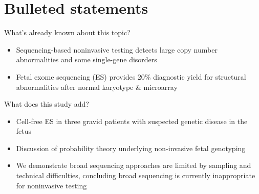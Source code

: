 \documentclass{article}\usepackage[]{graphicx}\usepackage[]{color}
\begin{document}
\title{}

\author[1,2,*]{Dayne L Filer}
\author[1]{Piotr A Mieczkowski}
\author[1]{Alicia Brandt}
\author[3]{Kelly L Gilmore}
\author[1,2]{Bradford C Powell}
\author[1]{Jonathan S Berg}
\author[1,2,4]{Kirk C Wilhelmsen}
\author[1,3]{Neeta L Vora}
\date{}

\maketitle

\linenumbers

\section*{Bulleted statements}

What's already known about this topic?
\begin{itemize}
    \item Sequencing-based noninvasive testing detects large copy number abnormalities and some single-gene disorders
    \item Fetal exome sequencing (ES) provides 20\% diagnostic yield for structural abnormalities after normal karyotype \& microarray
\end{itemize}

What does this study add?
\begin{itemize}
    \item Cell-free ES in three gravid patients with suspected genetic disease in the fetus
    \item Discussion of probability theory underlying non-invasive fetal genotyping
    \item We demonstrate broad sequencing approaches are limited by sampling and technical difficulties, concluding broad sequencing is currently inappropriate for noninvasive testing
\end{itemize}
\end{document}
